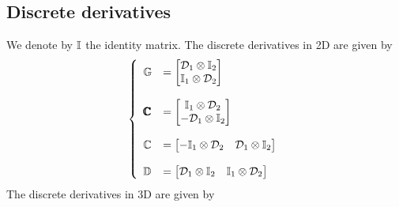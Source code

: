 \subsection{Discrete derivatives}
We denote by $\mathbb{I}$ the identity matrix. 
The discrete derivatives in 2D are given by
\begin{align}
  \left\{ 
  \begin{array}{ll}
  \mathbb{G} &= 
    \begin{bmatrix}
      \mathcal{D}_1 \otimes \mathbb{I}_2
      \\
      \mathbb{I}_1 \otimes \mathcal{D}_2
    \end{bmatrix}
  \\
  \\
  \pmb{\mathbb{C}} &= 
    \begin{bmatrix}
      \mathbb{I}_1 \otimes \mathcal{D}_2
      \\
    - \mathcal{D}_1 \otimes \mathbb{I}_2
    \end{bmatrix} 
  \\
  \\
  \mathbb{C} &= 
    \begin{bmatrix}
    - \mathbb{I}_1 \otimes \mathcal{D}_2
     & 
      \mathcal{D}_1 \otimes \mathbb{I}_2
    \end{bmatrix} 
  \\
  \\
  \mathbb{D} &= 
    \begin{bmatrix}
      \mathcal{D}_1 \otimes \mathbb{I}_2
     & 
      \mathbb{I}_1 \otimes \mathcal{D}_2
    \end{bmatrix}
  \end{array} \right.
  \label{eq:discrete-derivatives-2d}
\end{align}
The discrete derivatives in 3D are given by
